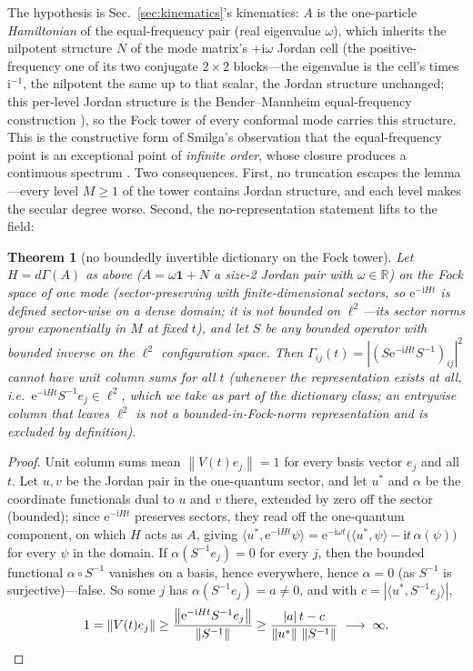 \documentclass[11pt]{article}
\newtheorem{theorem}{Theorem}[section]
\theoremstyle{definition}
\theoremstyle{remark}
\newcommand{\ii}{\mathrm{i}}
\newcommand{\ee}{\mathrm{e}}
\newcommand{\norm}[1]{\left\lVert #1 \right\rVert}
\begin{document}
The hypothesis is Sec.~\ref{sec:kinematics}'s kinematics: $A$ is
the one-particle \emph{Hamiltonian} of the equal-frequency pair
(real eigenvalue $\omega$), which inherits the nilpotent structure
$N$ of the mode matrix's $+\ii\omega$ Jordan cell (the
positive-frequency one of its two
conjugate $2\times2$ blocks---the eigenvalue is the cell's times
$\ii^{-1}$, the nilpotent the same up to that scalar, the Jordan
structure unchanged; this per-level Jordan structure is the
Bender--Mannheim equal-frequency construction \cite{BenderMannheim2008PRD}),
so the Fock tower of
every conformal mode carries this structure.
This is the constructive form of Smilga's observation that the
equal-frequency point is an exceptional point of \emph{infinite
order}, whose closure produces a continuous spectrum
\cite{Smilga2014}. Two consequences. First, no truncation escapes
the lemma---every level $M\ge1$ of the tower contains Jordan
structure, and
each level makes the secular degree worse. Second, the
no-representation statement lifts to the field:

\begin{theorem}[no boundedly invertible dictionary on the Fock tower]
\label{thm:tower}
Let $H=d\Gamma(A)$ as above ($A=\omega\mathbf 1+N$ a size-2 Jordan
pair with $\omega\in\mathbb R$) on the Fock space of one mode
(sector-preserving with finite-dimensional sectors, so
$\ee^{-\ii Ht}$ is defined sector-wise on a dense domain; it is
\emph{not} bounded on $\ell^{2}$---its sector norms grow
exponentially in $M$ at fixed $t$), and
let $S$ be any bounded operator with bounded inverse on the
$\ell^{2}$ configuration space. Then
$\Gamma_{ij}(t)=|(S\ee^{-\ii Ht}S^{-1})_{ij}|^{2}$ cannot have unit
column sums for all $t$ (whenever the representation exists at all,
i.e.\ $\ee^{-\ii Ht}S^{-1}e_{j}\in\ell^{2}$, which we take as part of the
dictionary class; an entrywise column that leaves $\ell^{2}$ is not a
bounded-in-Fock-norm representation and is excluded by definition).
\end{theorem}

\begin{proof}
Unit column sums mean $\norm{V(t)e_{j}}=1$ for every basis vector
$e_{j}$ and all $t$. Let $u,v$ be
the Jordan pair in the one-quantum sector, and let $u^{*}$ and
$\alpha$ be the coordinate functionals dual to $u$ and $v$ there,
extended by zero off the sector (bounded); since
$\ee^{-\ii Ht}$ preserves sectors, they read off the one-quantum
component, on which $H$ acts as $A$, giving
$\langle u^{*},\ee^{-\ii Ht}\psi\rangle
=\ee^{-\ii\omega t}\bigl(\langle u^{*},\psi\rangle
-\ii t\,\alpha(\psi)\bigr)$
for every $\psi$ in the domain.
If $\alpha(S^{-1}e_{j})=0$ for every $j$, then the bounded
functional $\alpha\circ S^{-1}$ vanishes on a basis, hence
everywhere, hence $\alpha=0$ (as $S^{-1}$ is surjective)---false.
So some $j$ has $\alpha(S^{-1}e_{j})=a\neq0$, and with
$c=|\langle u^{*},S^{-1}e_{j}\rangle|$,
\[
1=\norm{V(t)e_{j}}
\ge\frac{\norm{\ee^{-\ii Ht}S^{-1}e_{j}}}{\norm{S^{-1}}}
\ge\frac{|a|\,t-c}{\norm{u^{*}}\,\norm{S^{-1}}}
\;\longrightarrow\;\infty .
\qedhere
\]
\end{proof}
\end{document}
